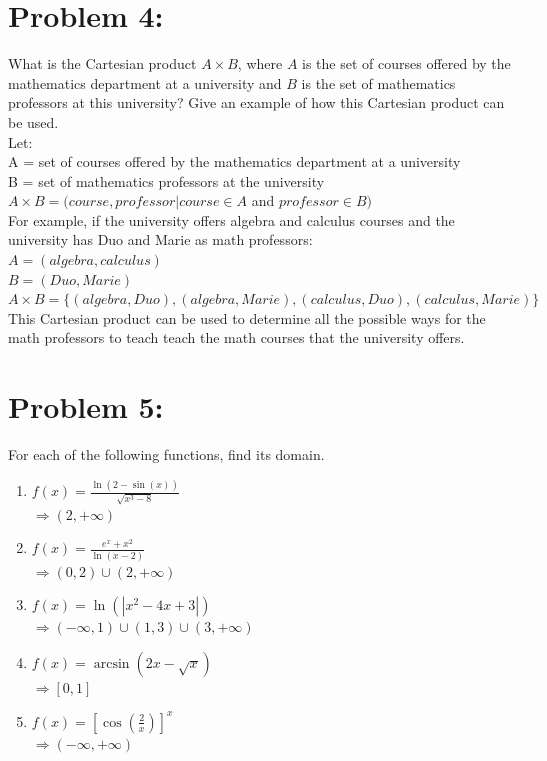 \documentclass[12pt,en,a4paper]{article}
\begin{document}
	\section*{Problem 4:}
	What is the Cartesian product $A \times B$, where $A$ is the set of courses offered by the mathematics department at a university and $B$ is the set of mathematics professors at this university? Give an example of how this Cartesian product can be used.\\
	
	Let:\\
	A = set of courses offered by the mathematics department at a university\\
	B = set of mathematics professors at the university\\
	
	$A \times B = (course, professor|course \in A$ and $professor \in B)$\\
	
	For example, if the university offers algebra and calculus courses and the university has Duo and Marie as math professors:\\
	$A = (algebra, calculus)$\\
	$B = (Duo, Marie)$\\
	$A \times B = \{(algebra, Duo), (algebra, Marie), (calculus, Duo), (calculus, Marie)\}$\\
	
	This Cartesian product can be used to determine all the possible ways for the math professors to teach teach the math courses that the university offers.
\newpage
{}
	\section*{Problem 5:}
	For each of the following functions, find its domain.
	\begin{enumerate}
		\item $f(x) = \frac{\ln (2- \sin (x))}{\sqrt{x^3 -8}}$\\
		$\Rightarrow (2,+\infty)$
		\item $f(x) = \frac{e^x +x^2}{\ln(x-2)}$\\
		$\Rightarrow (0,2) \cup (2,+\infty)$
		\item $f(x) = \ln(|x^2 -4x +3|)$\\
		$\Rightarrow (-\infty, 1) \cup (1,3) \cup (3, +\infty)$
		\item $f(x) = \arcsin(2x -\sqrt{x})$\\
		$\Rightarrow [0,1]$
		\item $f(x) = [\cos(\frac{2}{x})]^x$\\
		$\Rightarrow (-\infty,+\infty)$
	\end{enumerate}
\newpage
{}
\end{document}
